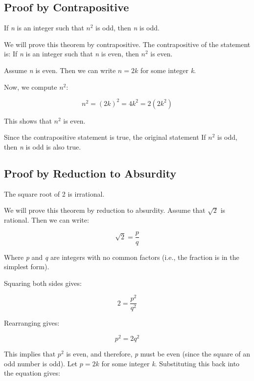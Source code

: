 \subsection{Proof by Contrapositive}

If \emph{n} is an integer such that \( n^2 \) is odd, then \emph{n} is odd.
\vspace{\baselineskip}

We will prove this theorem by contrapositive. The contrapositive of the statement is: If \emph{n} is an 
integer such that \emph{n} is even, then \( n^2 \) is even.
\vspace{\baselineskip}

Assume \emph{n} is even. Then we can write \( n = 2k \) for some integer \emph{k}.
\vspace{\baselineskip}

Now, we compute \( n^2 \):
	
\[
	n^2 = {(2k)}^2 = 4k^2 = 2(2k^2)
\]

This shows that \( n^2 \) is even.
\vspace{\baselineskip}

Since the contrapositive statement is true, the original statement If \( n^2 \) is odd, then \emph{n} is 
odd is also true.

\QED

\subsection{Proof by Reduction to Absurdity}

The square root of 2 is irrational.
\vspace{\baselineskip}

We will prove this theorem by reduction to absurdity. Assume that \( \sqrt{2} \) is rational. Then we can 
write:

\[
	\sqrt{2} = \frac{p}{q}
\]

Where \emph{p} and \emph{q} are integers with no common factors (i.e., the fraction is in the simplest 
form).
\vspace{\baselineskip}

Squaring both sides gives:

\[
	2 = \frac{p^2}{q^2}
\]
	
Rearranging gives:

\[
	p^2 = 2q^2
\]
	
This implies that \( p^2 \) is even, and therefore, \emph{p} must be even (since the square of an 
odd number is odd). Let \( p = 2k \) for some integer \emph{k}. Substituting this back into the 
equation gives:

